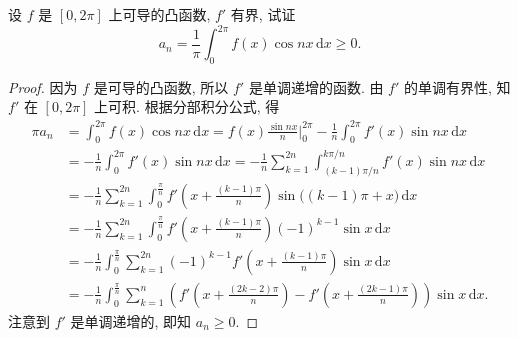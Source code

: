 \documentclass[../../main.tex]{subfiles}%
\begin{document}
\begin{example}
设 \( f \) 是 \( [0, 2\pi] \) 上可导的凸函数, \( f' \) 有界, 试证  
\[
a_n = \frac{1}{\pi} \int_{0}^{2\pi} f(x) \cos nx \, \mathrm{d}x \geqslant 0.
\]  
\end{example}
\begin{proof}

因为 \( f \) 是可导的凸函数, 所以 \( f' \) 是单调递增的函数. 由 \( f' \) 的单调有界性, 知 \( f' \) 在 \( [0, 2\pi] \) 上可积. 根据分部积分公式, 得  
\[
\begin{aligned}
\pi a_n &= \int_{0}^{2\pi} f(x) \cos nx \, \mathrm{d}x = f(x) \frac{\sin nx}{n} \bigg|_{0}^{2\pi} - \frac{1}{n} \int_{0}^{2\pi} f'(x) \sin nx \, \mathrm{d}x \\
&= -\frac{1}{n} \int_{0}^{2\pi} f'(x) \sin nx \, \mathrm{d}x = -\frac{1}{n} \sum_{k=1}^{2n} \int_{(k - 1)\pi/n}^{k\pi/n} f'(x) \sin nx \, \mathrm{d}x \\
&= -\frac{1}{n} \sum_{k=1}^{2n} \int_{0}^{\frac{\pi}{n}} f' \left( x + \frac{(k - 1)\pi}{n} \right) \sin \big( (k - 1)\pi + x \big) \, \mathrm{d}x \\
&= -\frac{1}{n} \sum_{k=1}^{2n} \int_{0}^{\frac{\pi}{n}} f' \left( x + \frac{(k - 1)\pi}{n} \right) (-1)^{k - 1} \sin x \, \mathrm{d}x \\
&= -\frac{1}{n} \int_{0}^{\frac{\pi}{n}} \sum_{k=1}^{2n} (-1)^{k - 1} f' \left( x + \frac{(k - 1)\pi}{n} \right) \sin x \, \mathrm{d}x \\
&= -\frac{1}{n} \int_{0}^{\frac{\pi}{n}} \sum_{k=1}^{n} \left( f' \left( x + \frac{(2k - 2)\pi}{n} \right) - f' \left( x + \frac{(2k - 1)\pi}{n} \right) \right) \sin x \, \mathrm{d}x.
\end{aligned}
\]  
注意到 \( f' \) 是单调递增的, 即知 \( a_n \geqslant 0 \).

\end{proof}
\end{document}
